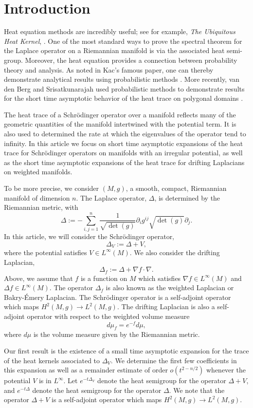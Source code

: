 \documentclass[letterpaper,12pt]{amsart}
\newcommand{\pa}{\partial}
\begin{document}
\section{Introduction}
Heat equation methods are incredibly useful; see for example, {\it The Ubiquitous Heat Kernel},
\cite{tubhk}.  One of the most standard ways to prove the spectral theorem for the Laplace operator on a Riemannian manifold is via the associated heat semi-group.  Moreover, the heat equation provides a connection between probability theory and analysis.  As noted in Kac's famous paper, one can thereby demonstrate analytical results using probabilistic methods \cite{kac}.  More recently, van den Berg and Srisatkunarajah used probabilistic methods to demonstrate results for the short time asymptotic behavior of the heat trace on polygonal domains \cite{vdbs}.

The heat trace of a Schr\"odinger operator over a manifold reflects many of the geometric quantities of the manifold intertwined with the potential term. It is also used to determined the rate at which the eigenvalues of the operator tend to infinity. In this article we focus on short time asymptotic expansions of the heat trace for Schr\"odinger operators on manifolds with an irregular potential, as well as the short time asymptotic expansions of the heat trace for drifting Laplacians on weighted manifolds.

To be more precise, we consider $(M,g)$, a smooth, compact, Riemannian manifold of dimension $n$.  The Laplace operator, $\Delta$,  is determined by the Riemannian metric, with
$$\Delta := -\sum_{i,j=1} ^n \frac{1}{\sqrt{\det(g)}} \pa_i g^{ij} \sqrt{\det(g)} \pa_j.$$
In this article, we will consider the Schr\"odinger operator,
$$\Delta_V := \Delta + V,$$
where the potential satisfies $V \in L^\infty (M)$.  We also consider the drifting Laplacian,
$$\Delta_f := \Delta + \nabla f \cdot \nabla.$$
Above, we assume that $f$ is a function on $M$ which satisfies $\nabla f \in L^\infty(M)$ and $\Delta f \in L^\infty (M)$.  The operator $\Delta_f$ is also known as the weighted Laplacian or Bakry-\'Emery Laplacian.  The Schr\"odinger operator is a self-adjoint operator which maps $H^2 (M, g) \to L^2 (M,g)$.  The drifting Laplacian is also a self-adjoint operator with respect to the weighted volume measure
$$d\mu_f = e^{-f} d\mu,$$
where $d\mu$ is the volume measure given by the Riemannian metric.


Our first result is the existence of a small time asymptotic expansion for the trace of the heat kernels associated to $\Delta_V$.  We determine the first few coefficients in this expansion as well as a remainder estimate of order $ o(t^{2-n/2})$ whenever the potential $V$ is in $L^\infty$. Let $e^{-t\Delta_V}$ denote the heat semigroup for the operator $\Delta+V$, and $e^{-t\Delta}$ denote the heat semigroup for the operator $\Delta$.  We note that the operator $\Delta + V$ is a self-adjoint operator which maps $H^2 (M,g) \to L^2(M,g)$.
\end{document}
